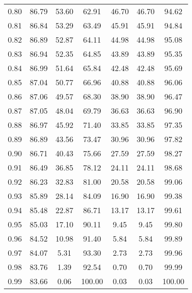\begin{tabular}{|c|c|c|c|c|c|c|}
      0.80 &     86.79 &     53.60 &      62.91 &   46.70 &      46.70 &         94.62 \\
      0.81 &     86.84 &     53.29 &      63.49 &   45.91 &      45.91 &         94.84 \\
      0.82 &     86.89 &     52.87 &      64.11 &   44.98 &      44.98 &         95.08 \\
      0.83 &     86.94 &     52.35 &      64.85 &   43.89 &      43.89 &         95.35 \\
      0.84 &     86.99 &     51.64 &      65.84 &   42.48 &      42.48 &         95.69 \\
      0.85 &     87.04 &     50.77 &      66.96 &   40.88 &      40.88 &         96.06 \\
      0.86 &     87.06 &     49.57 &      68.30 &   38.90 &      38.90 &         96.47 \\
      0.87 &     87.05 &     48.04 &      69.79 &   36.63 &      36.63 &         96.90 \\
      0.88 &     86.97 &     45.92 &      71.40 &   33.85 &      33.85 &         97.35 \\
      0.89 &     86.89 &     43.56 &      73.47 &   30.96 &      30.96 &         97.82 \\
      0.90 &     86.71 &     40.43 &      75.66 &   27.59 &      27.59 &         98.27 \\
      0.91 &     86.49 &     36.85 &      78.12 &   24.11 &      24.11 &         98.68 \\
      0.92 &     86.23 &     32.83 &      81.00 &   20.58 &      20.58 &         99.06 \\
      0.93 &     85.89 &     28.14 &      84.09 &   16.90 &      16.90 &         99.38 \\
      0.94 &     85.48 &     22.87 &      86.71 &   13.17 &      13.17 &         99.61 \\
      0.95 &     85.03 &     17.10 &      90.11 &    9.45 &       9.45 &         99.80 \\
      0.96 &     84.52 &     10.98 &      91.40 &    5.84 &       5.84 &         99.89 \\
      0.97 &     84.07 &      5.31 &      93.30 &    2.73 &       2.73 &         99.96 \\
      0.98 &     83.76 &      1.39 &      92.54 &    0.70 &       0.70 &         99.99 \\
      0.99 &     83.66 &      0.06 &     100.00 &    0.03 &       0.03 &        100.00 \\
\bottomrule
\end{tabular}
